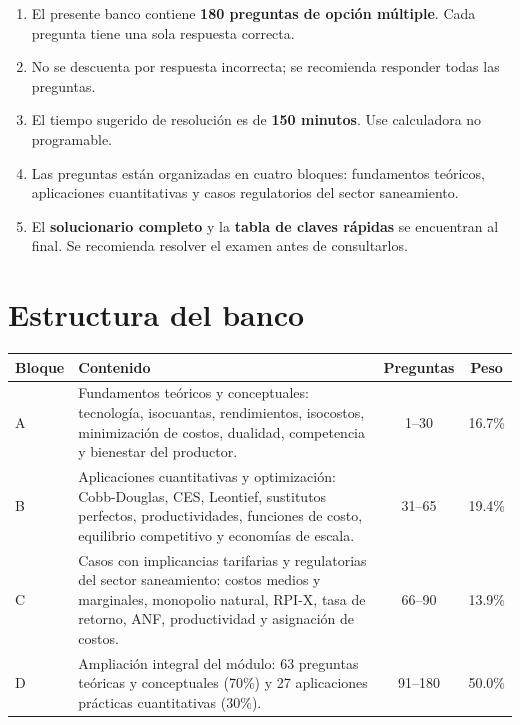 \documentclass[11pt,a4paper]{article}
\begin{document}
\begin{enumerate}[label=\arabic*.,leftmargin=1.6em,itemsep=3pt]
  \item El presente banco contiene \textbf{180 preguntas de opción múltiple}. Cada pregunta tiene una sola respuesta correcta.
  \item No se descuenta por respuesta incorrecta; se recomienda responder todas las preguntas.
  \item El tiempo sugerido de resolución es de \textbf{150 minutos}. Use calculadora no programable.
  \item Las preguntas están organizadas en cuatro bloques: fundamentos teóricos, aplicaciones cuantitativas y casos regulatorios del sector saneamiento.
  \item El \textbf{solucionario completo} y la \textbf{tabla de claves rápidas} se encuentran al final. Se recomienda resolver el examen antes de consultarlos.
\end{enumerate}

\section*{Estructura del banco}

\begin{center}
\renewcommand{\arraystretch}{1.25}
\begin{tabular}{@{}p{1.4cm}>{\raggedright\arraybackslash}p{7.6cm}cc@{}}
\toprule
\textbf{Bloque} & \textbf{Contenido} & \textbf{Preguntas} & \textbf{Peso} \\
\midrule
A & Fundamentos teóricos y conceptuales: tecnología, isocuantas, rendimientos, isocostos, minimización de costos, dualidad, competencia y bienestar del productor. & 1--30 & 16.7\% \\
B & Aplicaciones cuantitativas y optimización: Cobb-Douglas, CES, Leontief, sustitutos perfectos, productividades, funciones de costo, equilibrio competitivo y economías de escala. & 31--65 & 19.4\% \\
C & Casos con implicancias tarifarias y regulatorias del sector saneamiento: costos medios y marginales, monopolio natural, RPI-X, tasa de retorno, ANF, productividad y asignación de costos. & 66--90 & 13.9\% \\
D & Ampliación integral del módulo: 63 preguntas teóricas y conceptuales (70\%) y 27 aplicaciones prácticas cuantitativas (30\%). & 91--180 & 50.0\% \\
\bottomrule
\end{tabular}
\end{center}
\end{document}
